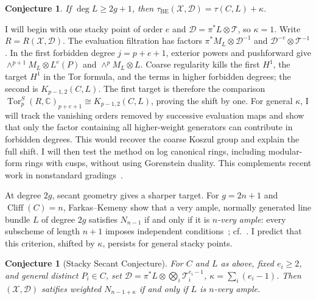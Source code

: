 \documentclass[11pt,reqno]{amsart}
\newtheorem{conjecture}[lemma]{Conjecture}
\theoremstyle{remark}
\newcommand{\Tor}{\operatorname{Tor}}
\newcommand{\cliff}{\operatorname{Cliff}}
\newcommand{\BE}{\operatorname{BE}}
\newcommand{\CC}{\mathbb{C}}
\newcommand{\cD}{\mathcal{D}}
\newcommand{\cT}{\mathcal{T}}
\newcommand{\cX}{\mathcal{X}}
\begin{document}
\begin{conjecture}\label{conj:high-degree}
If $\deg L\geq2g+1$, then $\tau_{\BE}(\cX,\cD)=\tau(C,L)+\kappa$.
\end{conjecture}
I will begin with one stacky point of order $e$ and $\cD=\pi^*L\otimes\cT$, so $\kappa=1$. Write $R=R(\cX,\cD)$. The evaluation filtration has factors $\pi^*M_L\otimes\cD^{-1}$ and $\cD^{-e}\otimes\cT^{-1}$. In the first forbidden degree $j=p+e+1$, exterior powers and pushforward give $\wedge^{p+1}M_L\otimes L^e(P)$ and $\wedge^pM_L\otimes L$. Coarse regularity kills the first $H^1$, the target $H^1$ in the Tor formula, and the terms in higher forbidden degrees; the second is $K_{p-1,2}(C,L)$. The first target is therefore the comparison $\Tor_p^S(R,\CC)_{p+e+1}\cong K_{p-1,2}(C,L)$, proving the shift by one. For general $\kappa$, I will track the vanishing orders removed by successive evaluation maps and show that only the factor containing all higher-weight generators can contribute in forbidden degrees. This would recover the coarse Koszul group and explain the full shift. I will then test the method on log canonical rings, including modular-form rings with cusps, without using Gorenstein duality. This complements recent work in nonstandard gradings~\cite{brownErman24-2,brownErmanStrands24,banksCobbSayrafi26,martinova25,DB25,bruce26}. 

At degree $2g$, secant geometry gives a sharper target. For $g=2n+1$ and $\cliff(C)=n$, Farkas--Kemeny show that a very ample, normally generated line bundle $L$ of degree $2g$ satisfies $N_{n-1}$ if and only if it is \emph{$n$-very ample}: every subscheme of length $n+1$ imposes independent conditions~\cite[Thm.~1.4]{farkasKemeny16}; cf.~\cite{farkasDifference24}. I predict that this criterion, shifted by $\kappa$, persists for general stacky points.

\begin{conjecture}[Stacky Secant Conjecture]\label{conj:weighted-secant}
For $C$ and $L$ as above, fixed $e_i\ge2$, and general distinct
$P_i\in C$, set $\cD=\pi^*L\otimes\bigotimes_i\cT_i^{e_i-1}$,
$\kappa=\sum_i(e_i-1)$. Then $(\cX,\cD)$ satifies weighted
$N_{n-1+\kappa}$ if and only if $L$ is $n$-very ample.
\end{conjecture}
\end{document}
